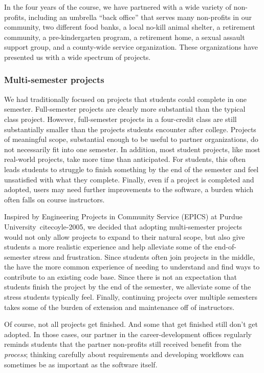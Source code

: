In the four years of the course, we have partnered with a wide
variety of non-profits, including an umbrella ``back office'' that
serves many non-profits in our community, two different food banks,
a local no-kill animal shelter, a retirement community, a
pre-kindergarten program, a retirement home, a sexual assault support
group, and a county-wide service organization.  These organizations
have presented us with a wide spectrum of projects.

\subsubsection{Multi-semester projects}

We had traditionally focused on projects that students could complete
in one semester.  Full-semester projects are clearly more substantial
than the typical class project.  However, full-semester projects
in a four-credit class are still substantially smaller than the
projects students encounter after college. 
Projects of meaningful scope, substantial enough to be useful to 
partner organizations, do not necessarily fit into one semester. 
In addition, most student projects, like most real-world projects,
take more time than anticipated.  For students, this often leads
students to struggle to finish something by the end of the semester and 
feel unsatisfied with what they complete.
Finally, even if a project is completed and adopted, 
users may need further improvements to the software, a burden 
which often falls on course instructors.

Inspired by Engineering Projects in Community Service (EPICS) at 
Purdue University~cite{coyle-2005}, 
we decided that adopting multi-semester projects would not only 
allow projects to expand to their natural scope, but also
give students a more realistic experience and help
alleviate some of the end-of-semester stress and frustration.  Since
students often join projects in the middle, the have the more common
experience of needing to understand and find ways to contribute to
an existing code base.  Since there is not an expectation that
students finish the project by the end of the semester, we alleviate
some of the stress students typically feel. Finally, continuing projects
over multiple semesters takes some of the burden of 
extension and maintenance off of instructors.

Of course, not all projects get finished.  And some that get finished
still don't get adopted.  In those cases, our partner in the 
career-development offices regularly reminds students that the
partner non-profits still received benefit from the \textit{process};
thinking carefully about requirements and developing workflows can
sometimes be as important as the software itself.

